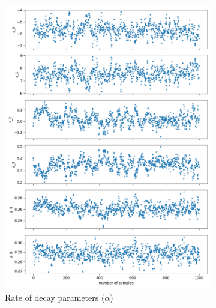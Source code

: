 \documentclass{article}
\begin{document}
    \begin{figure}[H]
        \centering
        \begin{subfigure}[b]{0.49\linewidth}
            \includegraphics[width=\linewidth]{figs/bayes_alpha_sampled_traceplot.png}
            \caption{Rate of decay parameters ($\alpha$)}
        \end{subfigure}
        \begin{subfigure}[b]{0.49\linewidth}

\end{subfigure}
\end{figure}
\end{document}
